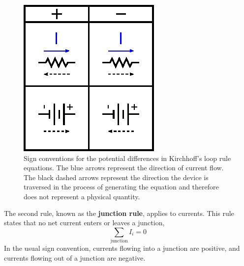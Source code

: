 \documentclass[11pt]{article}
\begin{document}
\begin{figure}[ht]
  \begin{center}
    \includegraphics{kirchhoffsigns.eps}
    \caption{Sign conventions for the potential differences in
      Kirchhoff's loop rule equations. The blue arrows represent the
      direction of current flow. The black dashed arrows represent
      the direction the device is traversed in the process of
      generating the equation and therefore does not represent a
      physical quantity.}
    \label{fig:kirchhoffsigns}
  \end{center}
\end{figure}

The second rule, known as the \textbf{junction rule}, applies to
currents. This rule states that no net current enters or leaves a
junction,
\begin{equation}
  \sum_\mathrm{junction} I_i = 0
  \label{eq:junction}
\end{equation}
In the usual sign convention, currents flowing into a junction are
positive, and currents flowing out of a junction are negative. 

\begin{latexonly}
  \noindent
  \hrulefill
\end{latexonly}
\htmlrule
\end{document}
